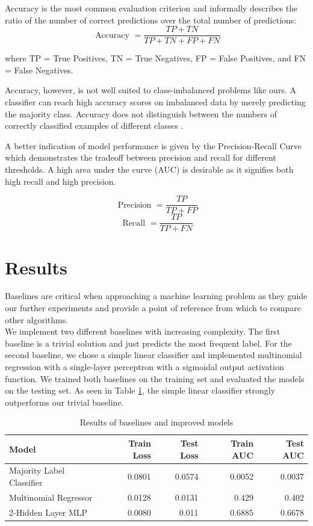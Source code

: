\documentclass[bsc,frontabs,twoside,singlespacing,parskip,deptreport]{infthesis}     %
\let\Oldsection\section
\renewcommand{\section}{\FloatBarrier\Oldsection}
\begin{document}
Accuracy is the most common evaluation criterion and informally describes the ratio of the number of correct predictions over the total number of predictions:
\[\text { Accuracy }=\frac{T P+T N}{T P+T N+F P+F N}\]

where TP = True Positives, TN = True Negatives, FP = False Positives, and FN = False Negatives.

Accuracy, however, is not well suited to class-imbalanced problems like ours. A classifier can reach high accuracy scores on imbalanced data by merely predicting the majority class. Accuracy does not distinguish between the numbers of correctly classified examples of different classes \cite{galar_review_2012}.

A better indication of model performance is given by the Precision-Recall Curve which demonstrates the tradeoff between precision and recall for different thresholds. A high area under the curve (AUC) is desirable as it signifies both high recall and high precision.

\[\text { Precision }=\frac{TP}{TP+ FP}\]
\[\text { Recall }=\frac{TP}{TP+ FN}\]



\section{Results}
Baselines are critical when approaching a machine learning problem as they guide our further experiments and provide a point of reference from which to compare other algorithms.\\
We implement two different baselines with increasing complexity. The first baseline is a trivial solution and just predicts the most frequent label.
For the second baseline, we chose a simple linear classifier and implemented multinomial regression with a single-layer perceptron with a sigmoidal output activation function.
We trained both baselines on the training set and evaluated the models on the testing set. As seen in Table \ref{baseline_table}, the simple linear classifier strongly outperforms our trivial baseline.

\begin{table}[h!]
\centering
\begin{tabular}{lrrrr}
\toprule
{Model} &  Train Loss &  Test Loss & Train AUC & Test AUC  \\
\midrule
Majority Label Classifier &  0.0801 & 0.0574 & 0.0052 & 0.0037  \\
Multinomial Regressor  & 0.0128 & 0.0131 & 0.429 & 0.402 \\
2-Hidden Layer MLP & 0.0080 & 0.011 & 0.6885 & 0.6678 \\
\bottomrule
\end{tabular}
\caption{Results of baselines and improved models}\label{baseline_table}
\end{table}
\end{document}
